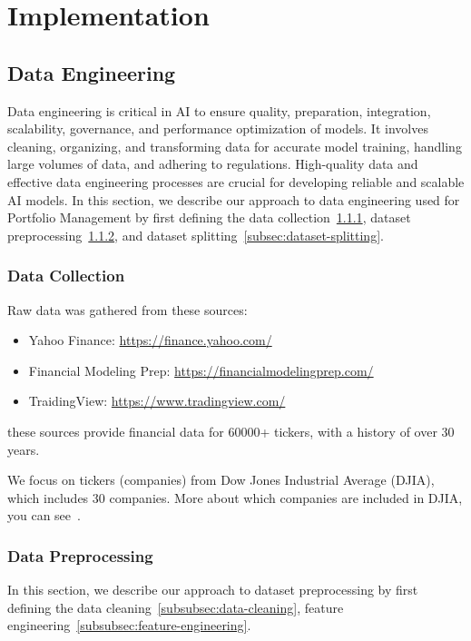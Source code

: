 \documentclass[../xlapes02]{subfiles}
\begin{document}
    \chapter{Implementation}\label{ch:implementation}


    \section{Data Engineering}\label{sec:data-engineering}
    Data engineering is critical in AI to ensure quality, preparation, integration, scalability, governance, and performance optimization of models. It involves cleaning, organizing, and transforming data for accurate model training, handling large volumes of data, and adhering to regulations. High-quality data and effective data engineering processes are crucial for developing reliable and scalable AI models. In this section, we describe our approach to data engineering used for Portfolio Management by first defining the data collection~\cref{subsec:data-collection}, dataset preprocessing~\cref{subsec:dataset-preprocessing}, and dataset splitting~\cref{subsec:dataset-splitting}.

    \subsection{Data Collection}\label{subsec:data-collection}
    Raw data was gathered from these sources:
    \begin{itemize}
        \item Yahoo Finance: \url{https://finance.yahoo.com/}
        \item Financial Modeling Prep: \url{https://financialmodelingprep.com/}
        \item TraidingView: \url{https://www.tradingview.com/}
    \end{itemize}
    these sources provide financial data for 60000+ tickers, with a history of over 30 years.

    We focus on tickers (companies) from Dow Jones Industrial Average (DJIA), which includes 30 companies. More about which companies are included in DJIA, you can see~\cite{enwiki:1141766585}.

    \subsection{Data Preprocessing}\label{subsec:dataset-preprocessing}
    In this section, we describe our approach to dataset preprocessing by first defining the data cleaning~\cref{subsubsec:data-cleaning}, feature engineering~\cref{subsubsec:feature-engineering}.
\end{document}
